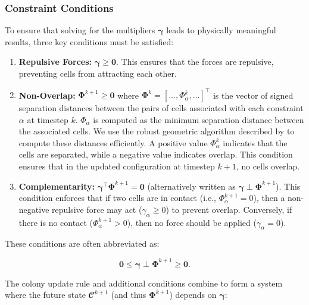 \documentclass[conference]{IEEEtran}
\begin{document}
\subsubsection{Constraint Conditions}

To ensure that solving for the multipliers $\boldsymbol{\gamma}$ leads to physically meaningful results, three key conditions must be satisfied:


\begin{enumerate}
    \item \textbf{Repulsive Forces:} $\boldsymbol{\gamma} \geq \mathbf{0}$. This ensures that the forces are repulsive, preventing cells from attracting each other.
    \item \textbf{Non-Overlap:} $\mathbf{\Phi}^{k+1} \geq \mathbf{0}$ where $\mathbf{\Phi}^k = [\dots, \Phi_\alpha^k, \dots]^\top$ is the vector of signed separation distances between the pairs of cells associated with each constraint $\alpha$ at timestep $k$.
          $\Phi_\alpha$ is computed as the minimum separation distance between the associated cells. We use the robust geometric algorithm described by \cite{Yan2019, GeometricTools} to compute these distances efficiently.
          A positive value $\Phi_\alpha^k$ indicates that the cells are separated, while a negative value indicates overlap.
          This condition ensures that in the updated configuration at timestep $k+1$, no cells overlap.
    \item   \textbf{Complementarity:} $\boldsymbol{\gamma}^\top \mathbf{\Phi}^{k+1} = \mathbf{0}$ (alternatively written as $\boldsymbol{\gamma} \perp \mathbf{\Phi}^{k+1}$). This condition enforces that if two cells are in contact (i.e., $\Phi_\alpha^{k+1} = 0$), then a non-negative repulsive force may act ($\gamma_\alpha \geq 0$) to prevent overlap.
          Conversely, if there is no contact ($\Phi_\alpha^{k+1} > 0$), then no force should be applied ($\gamma_\alpha = 0$).
\end{enumerate}

These conditions are often abbreviated as:

\begin{equation}
    \mathbf{0} \leq \boldsymbol{\gamma} \perp \mathbf{\Phi}^{k+1} \geq \mathbf{0}.
\end{equation}


The colony update rule and additional conditions combine to form a system where the future state $\mathbfcal{C}^{k+1}$ (and thus $\mathbf{\Phi}^{k+1}$) depends on $\boldsymbol{\gamma}$:
\end{document}
